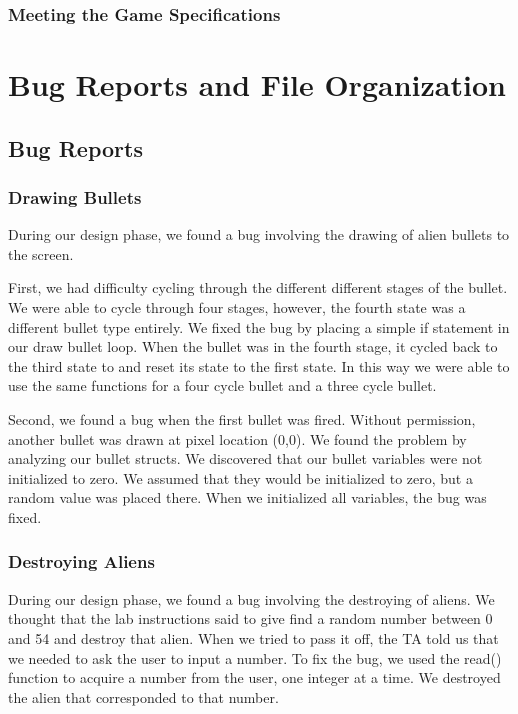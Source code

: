 \documentclass[11pt,letter,oneside]{report}
\begin{document}
\subsection{Meeting the Game Specifications}

\chapter{Bug Reports and File Organization}

\section{Bug Reports}

\subsection{Drawing Bullets}
During our design phase, we found a bug involving the drawing of alien bullets to the screen. 

First, we had difficulty cycling through the different different stages of the bullet. We were able to cycle through four stages, however, the fourth state was a different bullet type entirely. We fixed the bug by placing a simple if statement in our draw bullet loop. When the bullet was in the fourth stage, it cycled back to the third state to and reset its state to the first state. In this way we were able to use the same functions for a four cycle bullet and a three cycle bullet.

Second, we found a bug when the first bullet was fired. Without permission, another bullet was drawn at pixel location (0,0). We found the problem by analyzing our bullet structs. We discovered that our bullet variables were not initialized to zero. We assumed that they would be initialized to zero, but a random value was placed there. When we initialized all variables, the bug was fixed.

\subsection{Destroying Aliens}
During our design phase, we found a bug involving the destroying of aliens. We thought that the lab instructions said to give find a random number between 0 and 54 and destroy that alien. When we tried to pass it off, the TA told us that we needed to ask the user to input a number. To fix the bug, we used the read() function to acquire a number from the user, one integer at a time. We destroyed the alien that corresponded to that number.
\end{document}
